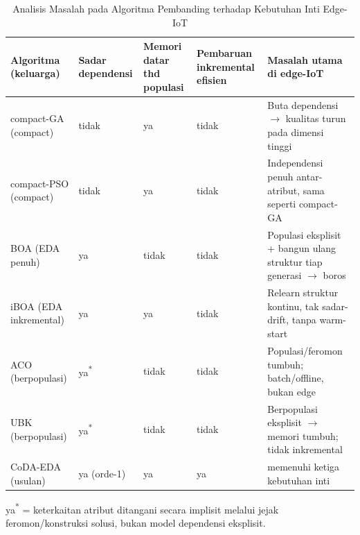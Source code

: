 \begin{table}[htbp]
\centering
\footnotesize
\setlength{\tabcolsep}{4pt}
\renewcommand{\arraystretch}{1.15}
\caption{Analisis Masalah pada Algoritma Pembanding terhadap Kebutuhan Inti Edge-IoT}
\label{tab:analisis-masalah}
\begin{tabular}{@{} 
  >{\raggedright\arraybackslash}p{3.2cm} 
  >{\centering\arraybackslash}p{1.4cm} 
  >{\centering\arraybackslash}p{1.8cm} 
  >{\centering\arraybackslash}p{1.8cm} 
  >{\raggedright\arraybackslash}p{5.5cm} 
@{}}
\toprule
Algoritma (keluarga) & Sadar dependensi & Memori datar thd populasi & Pembaruan inkremental efisien & Masalah utama di edge-IoT \\
\midrule
compact-GA (compact) & tidak & ya & tidak & Buta dependensi $\rightarrow$ kualitas turun pada dimensi tinggi \\
compact-PSO (compact) & tidak & ya & tidak & Independensi penuh antar-atribut, sama seperti compact-GA \\
BOA (EDA penuh) & ya & tidak & tidak & Populasi eksplisit + bangun ulang struktur tiap generasi $\rightarrow$ boros \\
iBOA (EDA inkremental) & ya & ya & tidak & Relearn struktur kontinu, tak sadar-drift, tanpa warm-start \\
ACO (berpopulasi) & ya\textsuperscript{*} & tidak & tidak & Populasi/feromon tumbuh; batch/offline, bukan edge \\
UBK (berpopulasi) & ya\textsuperscript{*} & tidak & tidak & Berpopulasi eksplisit $\rightarrow$ memori tumbuh; tidak inkremental \\
CoDA-EDA (usulan) & ya (orde-1) & ya & ya & memenuhi ketiga kebutuhan inti \\
\bottomrule
\end{tabular}
\par\vspace{0.5em}
{\footnotesize ya\textsuperscript{*} = keterkaitan atribut ditangani secara implisit melalui jejak feromon/konstruksi solusi, bukan model dependensi eksplisit.}
\end{table}